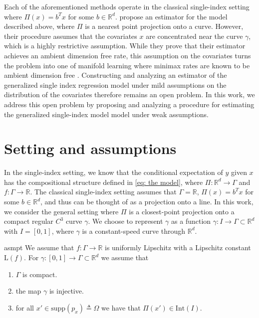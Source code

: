 \documentclass[11pt]{article}
\begin{document}
Each of the aforementioned methods operate in the classical single-index setting where $\Pi(x) = b^Tx$ for some $b \in \mathbb{R}^d$. \citet{wu2024conditional} propose an estimator for the model described above, where $\Pi$ is a nearest point projection onto a curve. However, their procedure assumes that the covariates $x$ are concentrated near the curve $\gamma$, which is a highly restrictive assumption. While they prove that their estimator achieves an ambient dimension free rate, this assumption on the covariates turns the problem into one of manifold learning where minimax rates are known to be ambient dimension free \cite{genovese2012minimax}. Constructing and analyzing an estimator of the generalized single index regression model under mild assumptions on the distribution of the covariates therefore remains an open problem. In this work, we address this open problem by proposing and analyzing a procedure for estimating the generalized single-index model model under weak assumptions.


\section{Setting and assumptions}

In the single-index setting, we know that the conditional expectation of $y$ given $x$ has the  compositional structure defined in \cref{eq: the model}, where $\Pi:\mathbb{R}^d \rightarrow \Gamma$ and $f: \Gamma\rightarrow\mathbb{R}$. The classical single-index setting assumes that $\Gamma = \mathbb{R}$, $\Pi(x) = b^{T}x$ for some $b \in \mathbb{R}^d$, and thus can be thought of as a projection onto a line. In this work, we consider the general setting where $\Pi$ is a closest-point projection onto a compact regular $C^3$ curve $\gamma$. We choose to represent $\gamma$ as a function $\gamma:I \rightarrow \Gamma \subset \mathbb{R}^d$ with $I = [0, 1]$, where $\gamma$ is a constant-speed curve through $\mathbb{R}^d$.
\begin{restatable}{asmpt}{} \label{assumption: the curve gamma}
    We assume that $f: \Gamma \rightarrow \mathbb{R}$ is uniformly Lipschitz with a Lipschitz constant $\text{L}(f)$. For $\gamma: [0, 1]\rightarrow \Gamma \subset \mathbb{R}^d$ we assume that
    \begin{enumerate}
        \item $\Gamma$ is compact.
        \item the map $\gamma$ is injective.
        \item for all $x' \in \text{supp}(p_x) \triangleq \Omega$ we have that $\Pi(x') \in \text{Int}(I)$.
    \end{enumerate}
\end{restatable}
\end{document}
